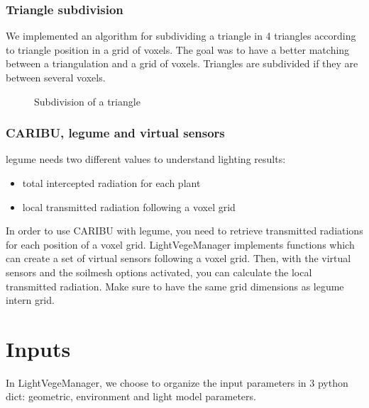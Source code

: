 \documentclass[letterpaper,10pt,english]{sphinxmanual}
\let\sphinxpxdimen\pdfpxdimen\else\newdimen\sphinxpxdimen
\begin{document}
\subsubsection{Triangle subdivision}
\label{\detokenize{architecture:triangle-subdivision}}
\sphinxAtStartPar
We implemented an algorithm for subdividing a triangle in 4 triangles according to triangle position in a grid of voxels.
The goal was to have a better matching between a triangulation and a grid of voxels.
Triangles are subdivided if they are between several voxels.

\begin{figure}[htbp]
\centering
\capstart

\noindent\sphinxincludegraphics[width=512.00000\sphinxpxdimen,height=230.00000\sphinxpxdimen]{{tesselation}.PNG}
\caption{Subdivision of a triangle}\label{\detokenize{architecture:id4}}\end{figure}


\subsubsection{CARIBU, l\sphinxhyphen{}egume and virtual sensors}
\label{\detokenize{architecture:caribu-l-egume-and-virtual-sensors}}
\sphinxAtStartPar
l\sphinxhyphen{}egume needs two different values to understand lighting results:
\begin{itemize}
\item {} 
\sphinxAtStartPar
total intercepted radiation for each plant

\item {} 
\sphinxAtStartPar
local transmitted radiation following a voxel grid

\end{itemize}

\sphinxAtStartPar
In order to use CARIBU with l\sphinxhyphen{}egume, you need to retrieve transmitted radiations for each position of a voxel grid.
LightVegeManager implements functions which can create a set of virtual sensors following a voxel grid.
Then, with the virtual sensors and the soilmesh options activated, you can calculate the local transmitted radiation.
Make sure to have the same grid dimensions as l\sphinxhyphen{}egume intern grid.

\sphinxstepscope


\section{Inputs}
\label{\detokenize{inputs:inputs}}\label{\detokenize{inputs:id1}}\label{\detokenize{inputs::doc}}
\sphinxAtStartPar
In LightVegeManager, we choose to organize the input parameters in 3 python dict: geometric, environment and light model parameters.
\end{document}
